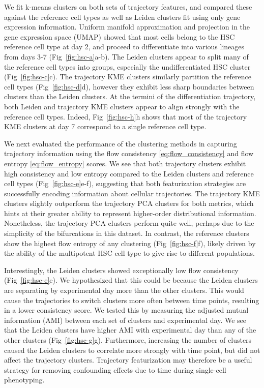 We fit k-means clusters on both sets of trajectory features, and compared these against the reference cell types as well as Leiden clusters fit using only gene expression information. Uniform manifold approximation and projection in the gene expression space (UMAP) showed that most cells belong to the HSC reference cell type at day 2, and proceed to differentiate into various lineages from days 3-7 (Fig~\ref{fig:hsc-a}a-b). The Leiden clusters appear to split many of the reference cell types into groups, especially the undifferentiated HSC cluster (Fig~\ref{fig:hsc-c}c). The trajectory KME clusters similarly partition the reference cell types (Fig~\ref{fig:hsc-d}d), however they exhibit less sharp boundaries between clusters than the Leiden clusters. At the termini of the  differentiation trajectory, both Leiden and trajectory KME clusters appear to align strongly with the reference cell types. Indeed, Fig~\ref{fig:hsc-h}h shows that most of the trajectory KME clusters at day 7 correspond to a single reference cell type.

We next evaluated the performance of the clustering methods in capturing trajectory information using the flow consistency \eqref{eq:flow_consistency} and flow entropy \eqref{eq:flow_entropy} scores. We see that both trajectory clusters exhibit high consistency and low entropy compared to the Leiden clusters and reference cell types (Fig~\ref{fig:hsc-e}e-f), suggesting that both featurization strategies are successfully encoding information about cellular trajectories. The trajectory KME clusters slightly outperform the trajectory PCA clusters for both metrics, which hints at their greater ability to represent higher-order distributional information. Nonetheless, the trajectory PCA clusters perform quite well,  perhaps due to the simplicity of the bifurcations in this dataset. In contrast, the reference clusters show the highest flow entropy of any clustering (Fig~\ref{fig:hsc-f}f), likely driven by the ability of the multipotent HSC cell type to give rise to different populations.

Interestingly, the Leiden clusters showed exceptionally low flow consistency (Fig~\ref{fig:hsc-e}e). We hypothesized that this could be because the Leiden clusters are separating by experimental day more than the other clusters. This would cause the trajectories to switch clusters more often between time points, resulting in a lower consistency score. We tested this by measuring the adjusted mutual information (AMI) between each set of clusters and experimental day. We see that the Leiden clusters have higher AMI with experimental day than any of the other clusters (Fig~\ref{fig:hsc-g}g). Furthermore, increasing the number of clusters caused the Leiden clusters to correlate more strongly with time point, but did not affect the trajectory clusters. Trajectory featurization may therefore be a useful strategy for removing confounding effects due to time during single-cell phenotyping. 

